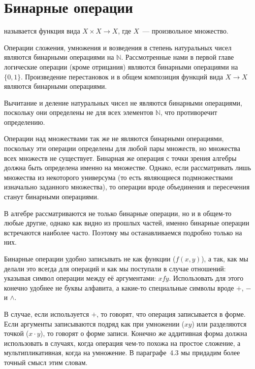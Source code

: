 \section{Бинарные операции}

\begin{definition}
 называется функция вида $X\times X\to X$, где $X$~--- произвольное множество. 
\end{definition}

\begin{example}
Операции сложения, умножения и возведения в степень натуральных чисел являются бинарными операциями на $\mathbb{N}$. Рассмотренные нами в первой главе логические операции (кроме отрицания) являются бинарными операциями на $\{0,1\}$. Произведение перестановок и в общем композиция функций вида $X\to X$ являются бинарными операциями.
\end{example}

\begin{example}
Вычитание и деление натуральных чисел не являются бинарными операциями, поскольку они определены не для всех элементов $\mathbb{N}$, что противоречит определению.
\end{example}

\begin{example}
Операции над множествами так же не являются бинарными операциями, поскольку эти операции определены для любой пары множеств, но множества всех множеств не существует. Бинарная же операция с точки зрения алгебры должна быть определена именно на множестве. Однако, если рассматривать лишь множества из некоторого универсума (то есть являющиеся подмножествами изначально заданного множества), то операции вроде объединения и пересечения станут бинарными операциями.
\end{example}

В алгебре рассматриваются не только бинарные операции, но и в общем-то любые другие, однако как видно из прошлых частей, именно бинарные операции встречаются наиболее часто. Поэтому мы останавливаемся подробно только на них.

Бинарные операции удобно записывать не как функции ($f(x, y)$), а так, как мы делали это всегда для операций и как мы поступали в случае отношений: указывая символ операции между её аргументами: $xfy$. Использовать для этого конечно удобнее не буквы алфавита, а какие-то специальные символы вроде $+$, $-$ и $\land$.


В случае, если используется $+$, то говорят, что операция записывается в  форме. Если аргументы записываются подряд как при умножении ($xy$) или разделяются точкой ($x\cdot y$), то говорят о  форме записи. Конечно же аддитивная форма должна использовать в случаях, когда операция чем-то похожа на простое сложение, а мультипликативная, когда на умножение. В параграфе~4.3 мы придадим более точный смысл этим словам.

